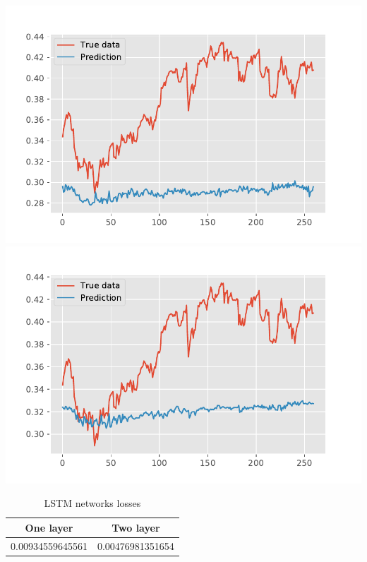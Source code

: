 \documentclass[12pt, a4paper]{article}
\begin{document}
\begin{multicols}{2}
{\centering
\includegraphics[width=\columnwidth]{src/stocks/lstm/one_layer_pred}\\
\label{fig:lstm_pred_one}}
{\centering
\includegraphics[width=\columnwidth]{src/stocks/lstm/two_layer_pred}\\
\label{fig:lstm_pred_two}}
\end{multicols}

\begin{table}[h!]
\centering
\caption{LSTM networks losses}
\begin{tabular}{ | c | c |}
  \hline
  One layer & Two layer \\
  \hline
  0.00934559645561 & 0.00476981351654 \\
  \hline
\end{tabular}
\label{table:lstm}
\end{table}
\end{document}
